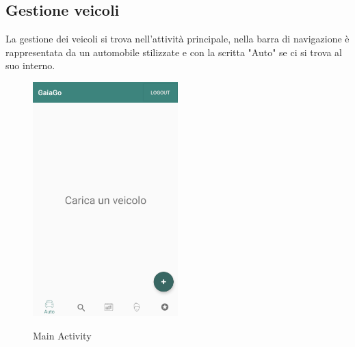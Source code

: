\subsection{Gestione veicoli}
La gestione dei veicoli si trova nell'attività principale, nella barra di navigazione è rappresentata da un automobile stilizzate e con la scritta "Auto" se ci si trova al suo interno.
 \begin{figure}[H] 
	\centering 
	\includegraphics[width=0.5\textwidth]{res/images/main_activity_vuota.png}\\
	\caption{Main Activity}
	\label{Login}
\end{figure}
\pagebreak
